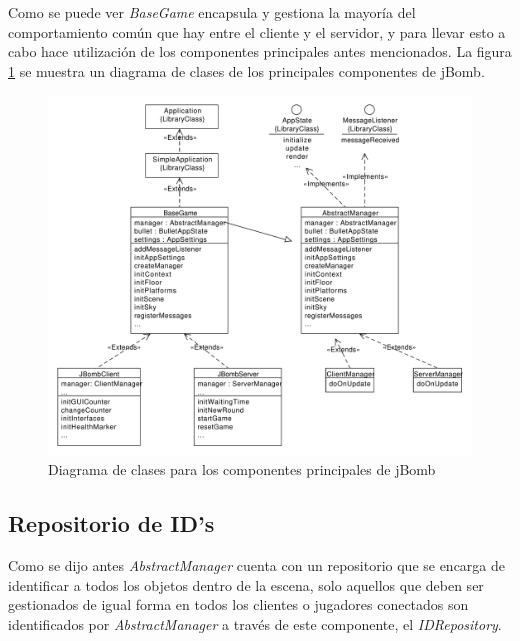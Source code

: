 \documentclass[a4paper,12pt,openany,oneside]{book}
\begin{document}
Como se puede ver \textit{BaseGame} encapsula y gestiona la mayoría del comportamiento común que hay entre el cliente y el servidor, y para llevar esto a cabo hace utilización de los componentes principales antes mencionados. La figura \ref{diagramlabel} se muestra un diagrama de clases de los principales componentes de jBomb.

\begin{figure}
\begin{center}
\includegraphics[scale=0.5]{diagram.pdf} 
\end{center}
\caption[Diagrama de clases - Componentes principales]{Diagrama de clases para los componentes principales de jBomb}
\label{diagramlabel}
\end{figure}

\subsection{Repositorio de ID's}
Como se dijo antes \textit{AbstractManager} cuenta con un repositorio que se encarga de identificar a todos los objetos dentro de la escena, solo aquellos que deben ser gestionados de igual forma en todos los clientes o jugadores conectados son identificados por \textit{AbstractManager} a través de este componente, el \textit{IDRepository}.
\end{document}
